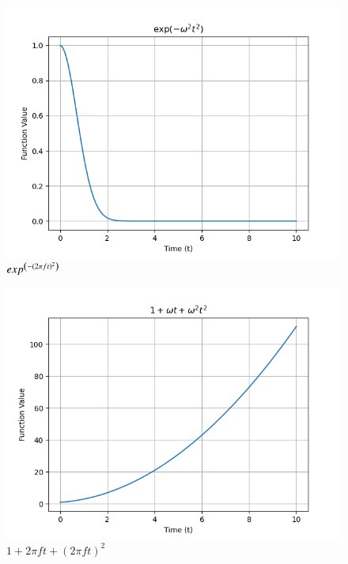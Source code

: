 \documentclass[journal,12pt,onecolumn]{IEEEtran}
\theoremstyle{remark}
\begin{document}
\begin{figure}[h!]
    \centering
    \includegraphics[width=\columnwidth]{figs/a1_fig5.png}
    \caption{$exp^{\left(-(2\pi ft)^2\right)}$}
    \label{fig:11.14.4.5}
\end{figure}
\begin{figure}[h!]
    \centering
    \includegraphics[width=\columnwidth]{figs/a1_fig6.png}
    \caption{$1+2\pi f t+(2\pi f t)^2$}
    \label{fig:11.14.4.6}
\end{figure}
\end{document}
